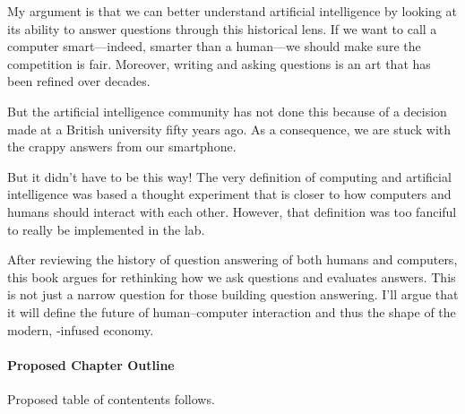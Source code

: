My argument is that we can better understand artificial intelligence by
looking at its ability to answer questions through this historical lens.
%
If we want to call a computer smart---indeed, smarter than a human---we should
make sure the competition is fair.
%
Moreover, writing and asking questions is an art that has been refined over
decades.

But the artificial intelligence community has not done this because of a
decision made at a British university fifty years ago.
%
As a consequence, we are stuck with the crappy answers from our smartphone.

But it didn't have to be this way!
%
The very definition of computing and artificial intelligence was based a
thought experiment that is closer to how computers and humans should interact
with each other.
%
However, that definition was too fanciful to really be implemented in the lab.

After reviewing the history of question answering of both humans and
computers, this book argues for rethinking how we ask questions and evaluates
answers.
%
This is not just a narrow question for those building question answering.
%
I'll argue that it will define the future of human--computer interaction and
thus the shape of the modern, -infused economy.


\paragraph{Proposed Chapter Outline}

Proposed table of contentents follows.

